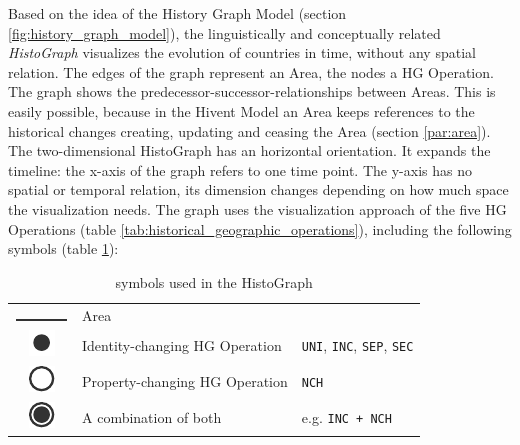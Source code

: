 Based on the idea of the History Graph Model (section \ref{fig:history_graph_model}), the linguistically and conceptually related \emph{HistoGraph} visualizes the evolution of countries in time, without any spatial relation. The edges of the graph represent an Area, the nodes a HG Operation. The graph shows the predecessor-successor-relationships between Areas. This is easily possible, because in the Hivent Model an Area keeps references to the historical changes creating, updating and ceasing the Area (section \ref{par:area}). The two-dimensional HistoGraph has an horizontal orientation. It expands the timeline: the x-axis of the graph refers to one time point. The y-axis has no spatial or temporal relation, its dimension changes depending on how much space the visualization needs. The graph uses the visualization approach of the five HG Operations (table \ref{tab:historical_geographic_operations}), including the following symbols (table \ref{tab:histograph_symbols}):

\begin{table}[H]
\begin{center}
\begin{tabular}{c l l}

  \raisebox{3.5\height}
  {\includegraphics{graphics/development/histograph/line}}
  & Area
  & \\

  \raisebox{-0.2\height}
  {\includegraphics{graphics/development/histograph/circle_filled}}
  & Identity-changing HG Operation
  & \texttt{UNI}, \texttt{INC}, \texttt{SEP}, \texttt{SEC} \\

  \raisebox{-0.2\height}
  {\includegraphics{graphics/development/histograph/circle_unfilled}}
  & Property-changing HG Operation
  & \texttt{NCH} \\

  \raisebox{-0.2\height}
  {\includegraphics{graphics/development/histograph/circle_combo}}
  & A combination of both
  & e.g. \texttt{INC + NCH}

\end{tabular}
\caption{symbols used in the HistoGraph}
\label{tab:histograph_symbols}
\end{center}
\end{table}

